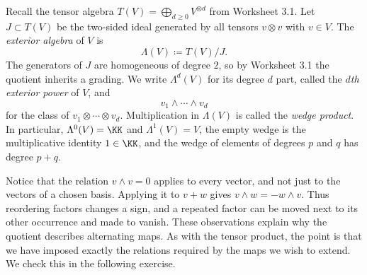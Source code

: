 \documentclass[12pt,reqno]{amsart}
\begin{document}
Recall the tensor algebra $T(V)=\bigoplus_{d\geq0}V^{\otimes d}$ from Worksheet 3.1. Let $J\subset T(V)$ be the two-sided ideal generated by all tensors $v\otimes v$ with $v\in V$. The \emph{exterior algebra} of $V$ is
\[
\Lambda(V)\coloneqq T(V)/J.
\]
The generators of $J$ are homogeneous of degree $2$, so by Worksheet 3.1 the quotient inherits a grading. We write $\Lambda^d(V)$ for its degree $d$ part, called the \emph{$d$th exterior power} of $V$, and
\[
v_1\wedge\cdots\wedge v_d
\]
for the class of $v_1\otimes\cdots\otimes v_d$. Multiplication in $\Lambda(V)$ is called the \emph{wedge product}. In particular, $\Lambda^0(V)=\KK$ and $\Lambda^1(V)=V$, the empty wedge is the multiplicative identity $1\in\KK$, and the wedge of elements of degrees $p$ and $q$ has degree $p+q$.

Notice that the relation $v\wedge v=0$ applies to every vector, and not just to the vectors of a chosen basis. Applying it to $v+w$ gives $v\wedge w=-w\wedge v$. Thus reordering factors changes a sign, and a repeated factor can be moved next to its other occurrence and made to vanish. These observations explain why the quotient describes alternating maps. As with the tensor product, the point is that we have imposed exactly the relations required by the maps we wish to extend. We check this in the following exercise.

\hrulefill
\end{document}

